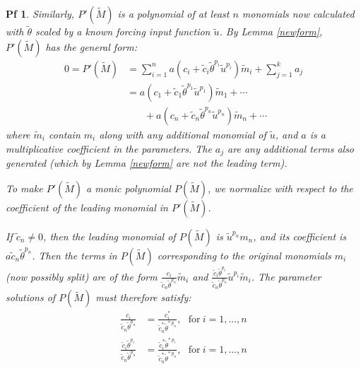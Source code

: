 \documentclass[10pt,a4paper]{amsart}
\newtheorem{pf}{Pf}
\begin{document}
\begin{pf}
    Similarly, $P'(\tilde{M})$ is a polynomial of at least $n$ monomials now calculated with $\tilde{\theta}$ scaled by a known forcing input function $\tilde{u}$. 
    By Lemma \ref{newform}, $P'(\tilde{M})$ has the general form: 
     \begin{align*}
        0 = P'(\tilde{M}) & =  \sum_{i = 1}^{n} a(c_i + \tilde{c}_i \tilde{\theta}^{p_i}\tilde{u}^{p_i} )  \tilde{m}_i + \sum_{j = 1}^{k} a_j \\
        & =  a(c_1 + \tilde{c}_1 \tilde{\theta}^{p_1} \tilde{u}^{p_1}) \tilde{m}_1 + \cdots \\
        & ~~~~~~~~+ a(c_{n} + \tilde{c}_{n} \tilde{\theta}^{p_{n}}\tilde{u}^{p_{n}}) \tilde{m}_{n} + \cdots
    \end{align*}
    where $\tilde{m}_i$ contain $m_i$ along with any additional monomial of $\tilde{u}$, and $a$ is a multiplicative coefficient in the parameters. The $a_j$ are any additional terms also generated (which by Lemma \ref{newform} are not the leading term).
    
    To make $P'(\tilde{M})$ a monic polynomial $P(\tilde{M})$, we normalize with respect to the coefficient of the leading monomial in $P'(\tilde{M})$. 
    
    If $\tilde{c}_n \neq 0$, then the leading monomial of $P(\tilde{M})$ is $\tilde{u}^{p_n}m_n$, and its coefficient is $a\tilde{c}_n \tilde{\theta}^{p_n}$.
    Then the terms in $P(\tilde{M})$ corresponding to the original monomials $m_i$ (now possibly split) are of the form $\frac{c_i}{\tilde{c}_n \tilde{\theta}^{p_n}} \tilde{m}_i$ and $\frac{\tilde{c}_i \tilde{\theta}^{p_i}}{\tilde{c}_n \tilde{\theta}^{p_n}} \tilde{u}^{p_i} \tilde{m}_i$.
    The parameter solutions of $P(\tilde{M})$ must therefore satisfy:
    \begin{align}
        \frac{c_i}{\tilde{c}_n \tilde{\theta}^{p_n}} & = \frac{c^*_i}{\tilde{c}_n^* \tilde{\theta}^{*~p_n}}, ~~~\text{for}~i=1,...,n \label{pnewsoln_thm1} \\
        \frac{\tilde{c}_i \tilde{\theta}^{p_i}}{\tilde{c}_n \tilde{\theta}^{p_n}} & = \frac{\tilde{c}^*_i \tilde{\theta}^{*~p_i}}{\tilde{c}_n^* \tilde{\theta}^{*~p_n}}, ~~~\text{for}~i=1,...,n \label{pnewsolnB_thm1} 
    \end{align} 
   

\end{pf}
\end{document}
